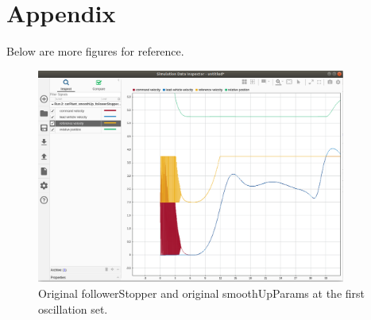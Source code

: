 \documentclass[12pt, letterpaper]{article}
\begin{document}
\section{Appendix}
Below are more figures for reference.

\begin{figure}[h]
\begin{center}
\includegraphics[width=4in]{originalFS_originalSUP_2}
\caption{Original followerStopper and original smoothUpParams at the first oscillation set.}
\label{default}
\end{center}
\end{figure}
\end{document}
